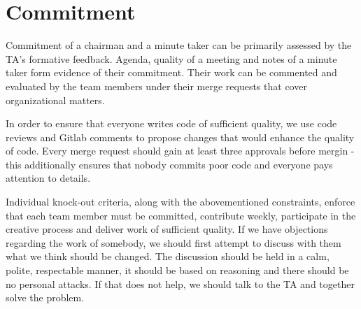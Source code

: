 \section{Commitment}

Commitment of a chairman and a minute taker can be primarily assessed by the TA's formative feedback. Agenda, quality of a meeting and notes of a minute taker form evidence of their commitment. Their work can be commented and evaluated by the team members under their merge requests that cover organizational matters.

In order to ensure that everyone writes code of sufficient quality, we use code reviews and Gitlab comments to propose changes that would enhance the quality of code. Every merge request should gain at least three approvals before mergin - this additionally ensures that nobody commits poor code and everyone pays attention to details.

Individual knock-out criteria, along with the abovementioned constraints, enforce that each team member must be committed, contribute weekly, participate in the creative process and deliver work of sufficient quality. If we have objections regarding the work of somebody, we should first attempt to discuss with them what we think should be changed. The discussion should be held in a calm, polite, respectable manner, it should be based on reasoning and there should be no personal attacks. If that does not help, we should talk to the TA and together solve the problem.